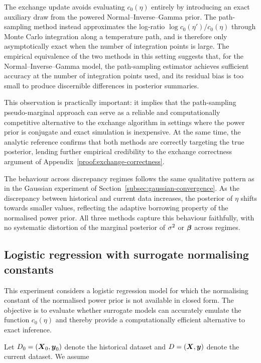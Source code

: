 The exchange update avoids evaluating $c_0(\eta)$ entirely by introducing an exact auxiliary draw from the powered Normal--Inverse--Gamma prior.
The path-sampling method instead approximates the log-ratio $\log c_0(\eta')/c_0(\eta)$ through Monte Carlo integration along a temperature path, and is therefore only asymptotically exact when the number of integration points is large.
The empirical equivalence of the two methods in this setting suggests that, for the Normal--Inverse--Gamma model, the path-sampling estimator achieves sufficient accuracy at the number of integration points used, and its residual bias is too small to produce discernible differences in posterior summaries.

This observation is practically important: it implies that the path-sampling pseudo-marginal approach can serve as a reliable and computationally competitive alternative to the exchange algorithm in settings where the power prior is conjugate and exact simulation is inexpensive.
At the same time, the analytic reference confirms that both methods are correctly targeting the true posterior, lending further empirical credibility to the exchange correctness argument of Appendix~\ref{proof:exchange-correctness}.

The behaviour across discrepancy regimes follows the same qualitative pattern as in the Gaussian experiment of Section~\ref{subsec:gaussian-convergence}.
As the discrepancy between historical and current data increases, the posterior of $\eta$ shifts towards smaller values, reflecting the adaptive borrowing property of the normalised power prior.
All three methods capture this behaviour faithfully, with no systematic distortion of the marginal posterior of $\sigma^2$ or $\boldsymbol{\beta}$ across regimes.

\subsection{Logistic regression with surrogate normalising constants}
\label{subsec:logistic-surrogate-experiment}

This experiment considers a logistic regression model for which the normalising constant of the normalised power prior is not available in closed form.
The objective is to evaluate whether surrogate models can accurately emulate the function $c_0(\eta)$ and thereby provide a computationally efficient alternative to exact inference.

Let $D_0=(\boldsymbol{X}_0,\boldsymbol{y}_0)$ denote the historical dataset and $D=(\boldsymbol{X},\boldsymbol{y})$ denote the current dataset.
We assume

